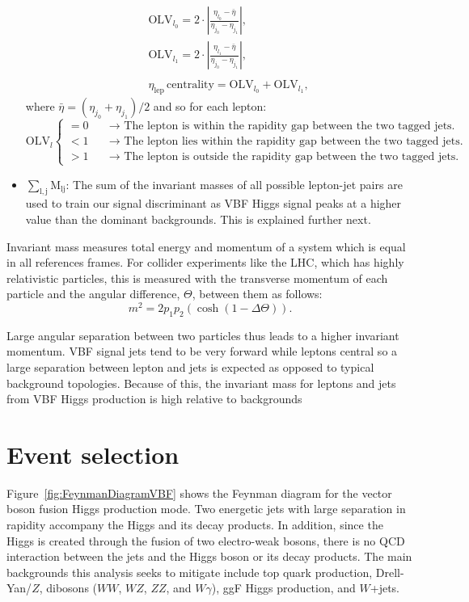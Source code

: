 \begin{itemize}
\begin{eqnarray}
&& \textrm{OLV}_{l_0} = 2 \cdot |\frac{\eta_{l_0}-\bar{\eta}}{\eta_{j_0}-\eta_{j_1}}|,  \nonumber\\
&& \textrm{OLV}_{l_1} = 2 \cdot |\frac{\eta_{l_1}-\bar{\eta}}{\eta_{j_0}-\eta_{j_1}}|,  \nonumber\\
&&\nonumber \\
&& \eta_{\mathrm{lep}} \, \textrm{centrality} = \textrm{OLV}_{l_0} + \textrm{OLV}_{l_1},
\label{eqn:contOLV_def}
\end{eqnarray}
where $\bar{\eta} = (\eta_{j_0} + \eta_{j_1})/2$ and so for each lepton: 
 \begin{equation}
   \textrm{OLV}_l \left\{
   \begin{array} {ll}
     = 0 & \quad \rightarrow \textrm{  The lepton is within the rapidity gap between the two tagged jets.} \\
     < 1 & \quad \rightarrow \textrm{  The lepton lies within the rapidity gap between the two tagged jets.} \\
     >1  & \quad \rightarrow \textrm{   The lepton is outside the rapidity gap between the two tagged jets.} 
    \end{array} \right. 
 \end{equation}
\item $\mathrm{\sum_{l,j} M_{lj}}$: The sum of the invariant masses of all possible lepton-jet pairs are used to train our signal discriminant as VBF Higgs signal peaks at a higher value than the dominant backgrounds. This is explained further next.  
\end{itemize}
Invariant mass measures total energy and momentum of a system which is equal in all references frames. For collider experiments like the LHC, which has highly relativistic particles, this is measured with the transverse momentum of each particle and the angular difference, $\Theta$, between them as follows:
\begin{equation}
m^2 = 2p_1p_2(\cosh(1-\Delta \Theta)).
\end{equation}

Large angular separation between two particles thus leads to a higher invariant momentum. VBF signal jets tend to be very forward while leptons central so a large separation between lepton and jets is expected as opposed to typical background topologies. Because of this, the invariant mass for leptons and jets from VBF Higgs production is high relative to backgrounds

\section{Event selection}
Figure~\ref{fig:FeynmanDiagramVBF} shows the Feynman diagram for the vector boson fusion Higgs production mode. Two energetic jets with large separation in rapidity accompany the Higgs and its decay products. In addition, since the Higgs is created through the fusion of two electro-weak bosons, there is no QCD interaction between the jets and the Higgs boson or its decay products. The main backgrounds this analysis seeks to mitigate include top quark production, Drell-Yan/$Z$, dibosons ($WW$, $WZ$, $ZZ$, and $W\gamma$), ggF Higgs production, and $W$+jets. 

